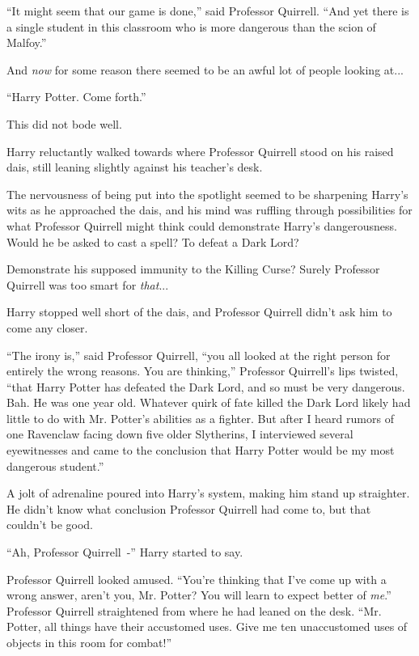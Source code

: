 ``It might seem that our game is done,'' said Professor Quirrell. ``And yet there is a single student in this classroom who is more dangerous than the scion of Malfoy.''

And \emph{now} for some reason there seemed to be an awful lot of people looking at...

``Harry Potter. Come forth.''

This did not bode well.

Harry reluctantly walked towards where Professor Quirrell stood on his raised dais, still leaning slightly against his teacher's desk.

The nervousness of being put into the spotlight seemed to be sharpening Harry's wits as he approached the dais, and his mind was ruffling through possibilities for what Professor Quirrell might think could demonstrate Harry's dangerousness. Would he be asked to cast a spell? To defeat a Dark Lord?

Demonstrate his supposed immunity to the Killing Curse? Surely Professor Quirrell was too smart for \emph{that}...

Harry stopped well short of the dais, and Professor Quirrell didn't ask him to come any closer.

``The irony is,'' said Professor Quirrell, ``you all looked at the right person for entirely the wrong reasons. You are thinking,'' Professor Quirrell's lips twisted, ``that Harry Potter has defeated the Dark Lord, and so must be very dangerous. Bah. He was one year old. Whatever quirk of fate killed the Dark Lord likely had little to do with Mr. Potter's abilities as a fighter. But after I heard rumors of one Ravenclaw facing down five older Slytherins, I interviewed several eyewitnesses and came to the conclusion that Harry Potter would be my most dangerous student.''

A jolt of adrenaline poured into Harry's system, making him stand up straighter. He didn't know what conclusion Professor Quirrell had come to, but that couldn't be good.

``Ah, Professor Quirrell~-'' Harry started to say.

Professor Quirrell looked amused. ``You're thinking that I've come up with a wrong answer, aren't you, Mr. Potter? You will learn to expect better of \emph{me}.'' Professor Quirrell straightened from where he had leaned on the desk. ``Mr. Potter, all things have their accustomed uses. Give me ten unaccustomed uses of objects in this room for combat!''

